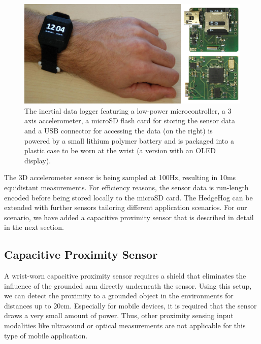 \documentclass[runningheads,a4paper]{llncs}
\begin{document}
\begin{figure}
	\centering
	\includegraphics[width=\textwidth]{Images/hardware_sensor_2.jpg}
	\caption{The inertial data logger featuring a low-power microcontroller, a 3 axis accelerometer, a microSD flash card for storing the sensor data and a USB connector for accessing the data (on the right) is powered by a small lithium polymer battery and is packaged into a plastic case to be worn at the wrist (a version with an OLED display).}
	\label{fig:sensornode}
\end{figure}

The 3D accelerometer sensor is being sampled at 100Hz, resulting in 10ms equidistant measurements. For efficiency reasons, the sensor data is run-length encoded before being stored locally to the microSD card. 
The HedgeHog can be extended with further sensors tailoring different application scenarios. For our scenario, we have added a capacitive proximity sensor that is described in detail in the next section.

\subsection{Capacitive Proximity Sensor}

A wrist-worn capacitive proximity sensor requires a shield that eliminates the influence of the grounded arm directly underneath the sensor. Using this setup, we can detect the proximity to a grounded object in the environments for distances up to 20cm. Especially for mobile devices, it is required that the sensor draws a very small amount of power. Thus, other proximity sensing input modalities like ultrasound or optical measurements are not applicable for this type of mobile application.
\end{document}
